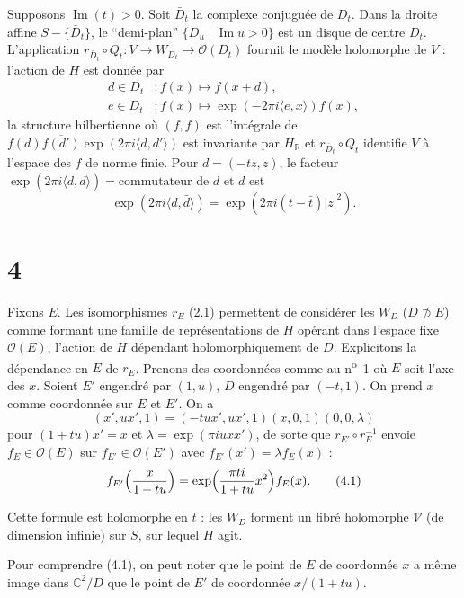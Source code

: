 \documentclass[12pt,a4paper]{article}
\theoremstyle{plain}
\theoremstyle{definition}
\theoremstyle{remark}
\DeclareMathOperator{\Impart}{Im}
\begin{document}
Supposons $\Impart(t) > 0$. Soit $\bar{D}_t$ la complexe conjuguée de $D_t$. Dans la droite affine $S - \{\bar{D}_t\}$, le ``demi-plan'' $\{D_u \mid \Impart u > 0\}$ est un disque de centre $D_t$. L'application $r_{\bar{D}_t} \circ Q_t \colon V \to W_{D_t} \to \mathcal{O}(D_t)$ fournit le modèle holomorphe de $V$ : l'action de $H$ est donnée par
\begin{align*}
d \in D_t &\colon f(x) \mapsto f(x + d), \\
e \in D_t &\colon f(x) \mapsto \exp(-2\pi i\langle e, x \rangle)f(x),\tag{3.1}
\end{align*}
la structure hilbertienne où $(f, f)$ est l'intégrale de $f(d)\overline{f(d')}\exp(2\pi i\langle d, d' \rangle)$ est invariante par $H_\mathbb{R}$ et $r_{\bar{D}_t} \circ Q_t$ identifie $V$ à l'espace des $f$ de norme finie. Pour $d = (-tz, z)$, le facteur $\exp(2\pi i\langle d, \bar{d} \rangle) = \text{commutateur de } d \text{ et } \bar{d}$ est
\[\exp(2\pi i\langle d, \bar{d} \rangle) = \exp(2\pi i(t - \bar{t})|z|^2).\]

\section*{4}

Fixons $E$. Les isomorphismes $r_E$ (2.1) permettent de considérer les $W_D$ ($D \not\supset E$) comme formant une famille de représentations de $H$ opérant dans l'espace fixe $\mathcal{O}(E)$, l'action de $H$ dépendant holomorphiquement de $D$. Explicitons la dépendance en $E$ de $r_E$. Prenons des coordonnées comme au n\textsuperscript{o}~1 où $E$ soit l'axe des $x$. Soient $E'$ engendré par $(1, u)$, $D$ engendré par $(-t, 1)$. On prend $x$ comme coordonnée sur $E$ et $E'$. On a
\[(x', ux', 1) = (-tux', ux', 1)(x, 0, 1)(0, 0, \lambda)\]
pour $(1 + tu)x' = x$ et $\lambda = \exp(\pi i uxx')$, de sorte que $r_{E'} \circ r_E^{-1}$ envoie $f_E \in \mathcal{O}(E)$ sur $f_{E'} \in \mathcal{O}(E')$ avec $f_{E'}(x') = \lambda f_E(x)$ :
\begin{equation}\label{eq:4.1}
f_{E'}\Bigl(\frac{x}{1 + tu}\Bigr) = \exp\Bigl(\frac{\pi ti}{1 + tu}x^2\Bigr)f_E(x).\tag{4.1}
\end{equation}

Cette formule est holomorphe en $t$ : les $W_D$ forment un fibré holomorphe $\mathscr{V}$ (de dimension infinie) sur $S$, sur lequel $H$ agit.

Pour comprendre (4.1), on peut noter que le point de $E$ de coordonnée $x$ a même image dans $\mathbb{C}^2/D$ que le point de $E'$ de coordonnée $x/(1 + tu)$.
\end{document}
